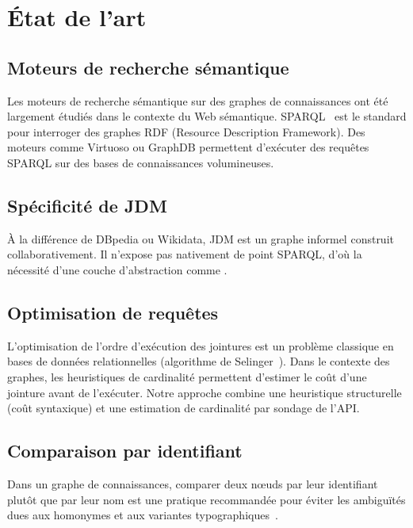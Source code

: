 \chapter{État de l'art}
\label{chap:etat_art}

\section{Moteurs de recherche sémantique}

Les moteurs de recherche sémantique sur des graphes de connaissances ont été largement étudiés dans le contexte du Web sémantique. SPARQL~\cite{sparql2013} est le standard pour interroger des graphes RDF (Resource Description Framework). Des moteurs comme Virtuoso ou GraphDB permettent d'exécuter des requêtes SPARQL sur des bases de connaissances volumineuses.

\section{Spécificité de JDM}

À la différence de DBpedia ou Wikidata, JDM est un graphe informel construit collaborativement. Il n'expose pas nativement de point SPARQL, d'où la nécessité d'une couche d'abstraction comme \wido{}.

\section{Optimisation de requêtes}

L'optimisation de l'ordre d'exécution des jointures est un problème classique en bases de données relationnelles (algorithme de Selinger~\cite{selinger1979}). Dans le contexte des graphes, les heuristiques de cardinalité permettent d'estimer le coût d'une jointure avant de l'exécuter. Notre approche combine une heuristique structurelle (coût syntaxique) et une estimation de cardinalité par sondage de l'API.

\section{Comparaison par identifiant}

Dans un graphe de connaissances, comparer deux nœuds par leur identifiant plutôt que par leur nom est une pratique recommandée pour éviter les ambiguïtés dues aux homonymes et aux variantes typographiques~\cite{noy2009}.
